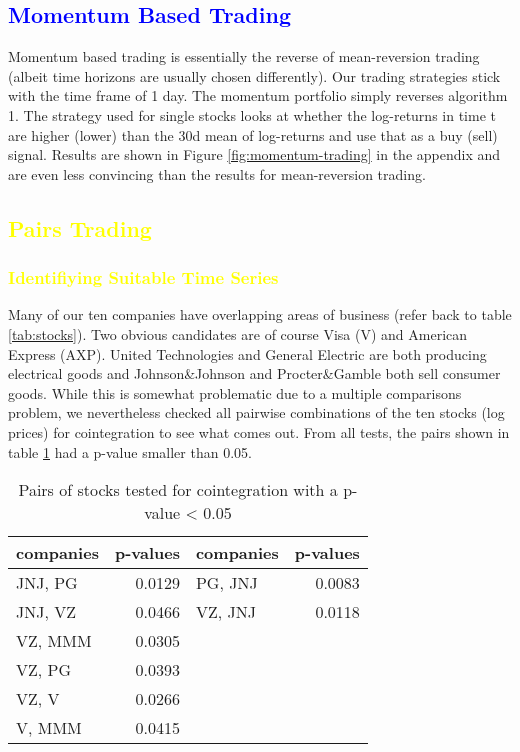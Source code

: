 \subsection{\textcolor{blue}{Momentum Based Trading}}
Momentum based trading is essentially the reverse of mean-reversion trading (albeit time horizons are usually chosen differently). Our trading strategies stick with the time frame of 1 day. The momentum portfolio simply reverses algorithm 1. The strategy used for single stocks looks at whether the log-returns in time t are higher (lower) than the 30d mean of log-returns and use that as a buy (sell) signal. Results are shown in Figure \ref{fig:momentum-trading} in the appendix and are even less convincing than the results for mean-reversion trading. 

\subsection{\textcolor{yellow}{Pairs Trading}}
\subsubsection{\textcolor{yellow}{Identifiying Suitable Time Series}}
Many of our ten companies have overlapping areas of business (refer back to table \ref{tab:stocks}). Two obvious candidates are of course Visa (V) and American Express (AXP). United Technologies and General Electric are both producing electrical goods and Johnson\&Johnson and Procter\&Gamble both sell consumer goods. While this is somewhat problematic due to a multiple comparisons problem, we nevertheless checked all pairwise combinations of the ten stocks (log prices) for cointegration to see what comes out. From all tests, the pairs shown in table \ref{tab:coint} had a p-value smaller than 0.05.

\begin{table}[h!]
    \centering
\small
\begin{tabular}{lrlr}
\toprule
companies &   p-values & companies & p-values \\
\midrule
JNJ, PG & 0.0129 & PG, JNJ & 0.0083  \\
\vspace{1ex}
JNJ, VZ & 0.0466 & VZ, JNJ & 0.0118 \\
\vspace{0.2ex}
VZ, MMM & 0.0305 & & \\
\vspace{0.2ex}
VZ, PG & 0.0393 & & \\
\vspace{0.2ex}
VZ, V & 0.0266  & & \\
\vspace{0.2ex}
V, MMM & 0.0415 & & \\
\bottomrule
\end{tabular}
    \caption{Pairs of stocks tested for cointegration with a p-value < 0.05}
    \label{tab:coint}
\end{table}

